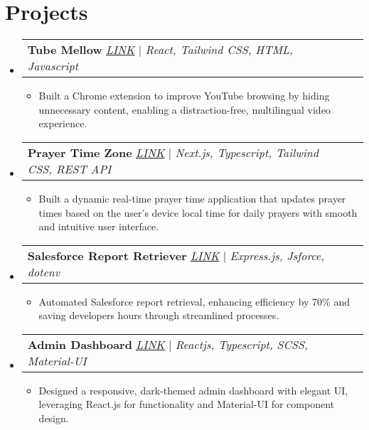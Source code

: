 \documentclass[letterpaper,11pt]{article}
\makeatletter
\newcommand{\resumeItem}[1]{
  \item\small{
    {#1 \vspace{-2pt}}
  }
}
\newcommand{\resumeProjectHeading}[2]{
    \item
    \begin{tabular*}{0.97\textwidth}{l@{\extracolsep{\fill}}r}
      \small#1 & #2 \\
    \end{tabular*}\vspace{-7pt}
}
\newcommand{\resumeSubHeadingListStart}{\begin{itemize}[leftmargin=0.15in, label={}]}
\newcommand{\resumeSubHeadingListEnd}{\end{itemize}}
\newcommand{\resumeItemListStart}{\begin{itemize}}
\newcommand{\resumeItemListEnd}{\end{itemize}\vspace{-5pt}}
\makeatother
\begin{document}
\section{Projects}
    \resumeSubHeadingListStart
      \resumeProjectHeading
          {\textbf{Tube Mellow} \href{https://chromewebstore.google.com/detail/tube-mellow/fgflinjcolmfjdkilakkcgennlkhgkgh}{\underline{\emph{LINK}}} | \emph{React, Tailwind CSS, HTML, Javascript}}{}
          \resumeItemListStart
            \resumeItem{Built a Chrome extension to improve YouTube browsing by hiding unnecessary content, enabling a distraction-free, multilingual video experience.}
          \resumeItemListEnd
      \resumeProjectHeading
          {\textbf{Prayer Time Zone} \href{https://prayer-time-zone.vercel.app/}{\underline{\emph{LINK}}} | \emph{Next.js, Typescript, Tailwind CSS, REST API}}{}
          \resumeItemListStart
            \resumeItem{Built a dynamic real-time prayer time application that updates prayer times based on the user’s device local time for daily prayers with smooth and intuitive user interface.}
          \resumeItemListEnd
      \resumeProjectHeading
          {\textbf{Salesforce Report Retriever} \href{https://github.com/hakeemsalman/Salesforce-Report-Retriever/}{\underline{\emph{LINK}}} | \emph{Express.js, Jsforce, dotenv}}{}
          \resumeItemListStart
            \resumeItem{Automated Salesforce report retrieval, enhancing efficiency by 70\% and saving developers hours through streamlined processes.}
          \resumeItemListEnd
      \resumeProjectHeading
          {\textbf{Admin Dashboard} \href{https://admin-dashboard-hakeem.vercel.app/}{\underline{\emph{LINK}}} | \emph{Reactjs, Typescript, SCSS, Material-UI}}{}
          \resumeItemListStart
            \resumeItem{Designed a responsive, dark-themed admin dashboard with elegant UI, leveraging React.js for functionality and Material-UI for component design.}
          \resumeItemListEnd
    \resumeSubHeadingListEnd


%
\end{document}
